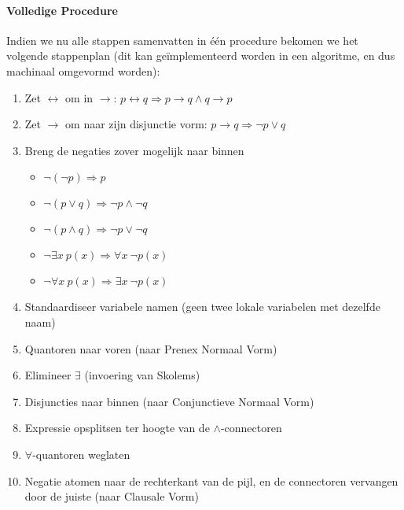 \paragraph{Volledige Procedure} Indien we nu alle stappen samenvatten in één procedure bekomen we het volgende stappenplan (dit kan geïmplementeerd worden in een algoritme, en dus machinaal omgevormd worden):
\begin{enumerate}
 \item Zet $\leftrightarrow$ om in $\rightarrow$: $p\leftrightarrow q\Rightarrow p\rightarrow q\wedge q\rightarrow p$
 \item Zet $\rightarrow$ om naar zijn disjunctie vorm: $p\rightarrow q\Rightarrow \neg p\vee q$
 \item Breng de negaties zover mogelijk naar binnen
\begin{itemize}
 \item $\neg\left(\neg p\right)\Rightarrow p$
 \item $\neg\left(p\vee q\right)\Rightarrow \neg p\wedge\neg q$
 \item $\neg\left(p\wedge q\right)\Rightarrow \neg p\vee\neg q$
 \item $\neg\exists x\ p\left(x\right)\Rightarrow \forall x\ \neg p\left(x\right)$
 \item $\neg\forall x\ p\left(x\right)\Rightarrow \exists x\ \neg p\left(x\right)$
\end{itemize}
 \item Standaardiseer variabele namen (geen twee lokale variabelen met dezelfde naam)
 \item Quantoren naar voren (naar Prenex Normaal Vorm)
 \item Elimineer $\exists$ (invoering van Skolems)
 \item Disjuncties naar binnen (naar Conjunctieve Normaal Vorm)
 \item Expressie opsplitsen ter hoogte van de $\wedge$-connectoren
 \item $\forall$-quantoren weglaten
 \item Negatie atomen naar de rechterkant van de pijl, en de connectoren vervangen door de juiste (naar Clausale Vorm)
\end{enumerate}
